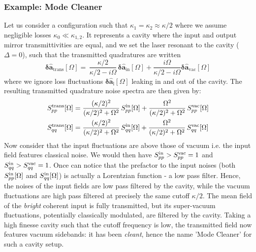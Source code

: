\subsubsection{Example: Mode Cleaner }
Let us consider a configuration such that $\kappa_1 = \kappa_2 \approx \kappa/2$ where we assume negligible losses $\kappa_0 \ll \kappa_{1,2}$. It represents a cavity where the input and output mirror transmittivities are equal, and we set the laser resonant to the cavity ($\Delta=0$), such that the transmitted quadratures are written
\begin{equation}
  \mathbf{\delta \hat{a}_{\mathrm{trans}}}[\Omega]  = \, \dfrac{ \kappa/2}{\kappa/2-i\Omega}  \, \mathbf{\delta \hat{a}_{\mathrm{in}}}[\Omega]   +  \dfrac{i\Omega}{\kappa/2-i\Omega}   \mathbf{\delta \hat{a}_{\mathrm{vac}}}[\Omega]  
\end{equation}
where we ignore loss fluctuations $\mathbf{\delta \hat{a}_{\mathrm{l}}}[\Omega] $ leaking in and out of the cavity. The resulting transmitted quadrature noise spectra are then given by: 
\begin{equation}
  \begin{split}
    S_{pp}^{\rm trans}[\Omega] &=\frac{(\kappa/2)^2}{(\kappa/2)^2+\Omega^2}\,S_{pp}^{\rm in}[\Omega]+\frac{\Omega^2}{(\kappa/2)^2+\Omega^2}\,S_{pp}^{\rm vac}[\Omega] \\
    S_{qq}^{\rm trans}[\Omega]&=\frac{(\kappa/2)^2}{(\kappa/2)^2+\Omega^2}\,S_{qq}^{\rm in}[\Omega]+\frac{\Omega^2}{(\kappa/2)^2+\Omega^2}\,S_{qq}^{\rm vac}[\Omega]
  \end{split}
\end{equation}
Now consider that the input fluctuations are above those of vacuum i.e. the input field features classical noise. We would then have $S_{pp}^{\rm in}> S_{pp}^{\rm vac}=1$ and $S_{qq}^{\rm in}> S_{qq}^{\rm vac}=1$. Once can notice that the prefactor to the input noises (both $S_{pp}^{\rm in}[\Omega]$ and $S_{qq}^{\rm in}[\Omega]$) is actually a Lorentzian function - a low pass filter. Hence, the noises of the input fields are low pass filtered by the cavity, while the vacuum fluctuations are high pass filtered at precisely the same cutoff $\kappa/2$. The mean field of the \textit{bright} coherent input is fully transmitted, but its super-vacuum fluctuations, potentially classically modulated, are filtered by the cavity. Taking a high finesse cavity such that the cutoff frequency is low, the transmitted field now features vacuum sidebands: it has been \textit{cleant}, hence the name 'Mode Cleaner' for such a cavity setup.  

